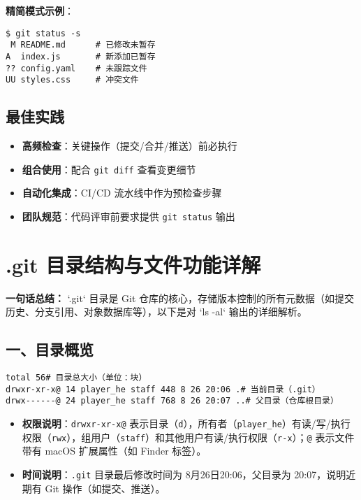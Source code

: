 \textbf{精简模式示例}：
\begin{verbatim}
$ git status -s
 M README.md      # 已修改未暂存
A  index.js       # 新添加已暂存
?? config.yaml    # 未跟踪文件
UU styles.css     # 冲突文件
\end{verbatim}

\subsection{最佳实践}
\begin{itemize}[leftmargin=*, nosep]
    \item \textbf{高频检查}：关键操作（提交/合并/推送）前必执行
    \item \textbf{组合使用}：配合 \texttt{git diff} 查看变更细节
    \item \textbf{自动化集成}：CI/CD 流水线中作为预检查步骤
    \item \textbf{团队规范}：代码评审前要求提供 \texttt{git status} 输出
\end{itemize}



\section{.git 目录结构与文件功能详解}
\textbf{一句话总结：}  
`.git` 目录是 Git 仓库的核心，存储版本控制的所有元数据（如提交历史、分支引用、对象数据库等），以下是对 `ls -al` 输出的详细解析。


\subsection{一、目录概览}
\begin{verbatim}
total 56# 目录总大小（单位：块）
drwxr-xr-x@ 14 player_he staff 448 8 26 20:06 .# 当前目录（.git）
drwx------@ 24 player_he staff 768 8 26 20:07 ..# 父目录（仓库根目录）
\end{verbatim}

\begin{itemize}[leftmargin=*, nosep]
    \item \textbf{权限说明}：\texttt{drwxr-xr-x@} 表示目录（\texttt{d}），所有者（\texttt{player\_he}）有读/写/执行权限（\texttt{rwx}），组用户（\texttt{staff}）和其他用户有读/执行权限（\texttt{r-x}）；\texttt{@} 表示文件带有 macOS 扩展属性（如 Finder 标签）。
    \item \textbf{时间说明}：\texttt{.git} 目录最后修改时间为 8月26日20:06，父目录为 20:07，说明近期有 Git 操作（如提交、推送）。
\end{itemize}


